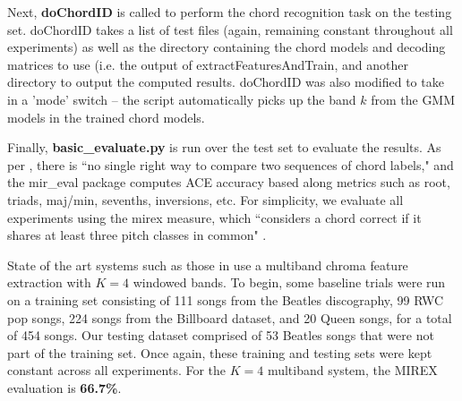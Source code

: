 \documentclass{article}
\begin{document}
	Next, \textsf{\textbf{doChordID}} is called to perform the chord recognition task on the testing set. \textsf{doChordID} takes a list of test files (again, remaining constant throughout all experiments) as well as the directory containing the chord models and decoding matrices to use (i.e. the output of \textsf{extractFeaturesAndTrain}, and another directory to output the computed results. \textsf{doChordID} was also modified to take in a 'mode' switch -- the script automatically picks up the band $k$ from the GMM models in the trained chord models.
	
	Finally, \textsf{\textbf{basic\_evaluate.py}} is run over the test set to evaluate the results. As per \cite{raffel2014mir}, there is ``no single right way to compare two sequences of chord labels," and the \textsf{mir\_eval} package computes ACE accuracy based along metrics such as root, triads, maj/min, sevenths, inversions, etc. For simplicity, we evaluate all experiments using the \textsf{mirex} measure, which ``considers a chord correct if it shares at least three pitch classes in common" \cite{raffel2014mir}.
	
	State of the art systems such as those in \cite{cho2014on} use a multiband chroma feature extraction with $K = 4$ windowed bands. To begin, some baseline trials were run on a training set consisting of 111 songs from the Beatles discography, 99 RWC pop songs, 224 songs from the Billboard dataset, and 20 Queen songs, for a total of 454 songs. Our testing dataset comprised of 53 Beatles songs that were not part of the training set. Once again, these training and testing sets were kept constant across all experiments. For the $K = 4$ multiband system, the \textsf{MIREX} evaluation is \textbf{66.7\%}.
	
\end{document}
